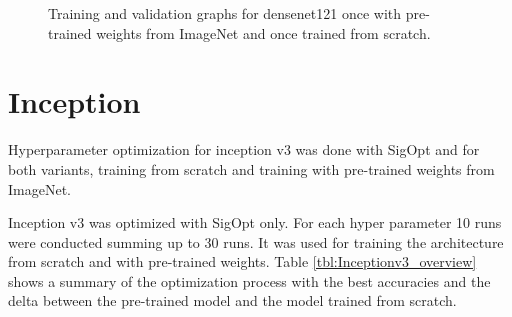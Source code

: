 \begin{figure}[h]
\centering
\caption{Training and validation graphs for densenet121 once with pre-trained weights from ImageNet and once trained from scratch.}
\label{fig:densenet121-graph}
\end{figure}












\section{Inception}


Hyperparameter optimization for inception v3 was done with SigOpt and for both variants, training from scratch and training with pre-trained weights from ImageNet.

Inception v3 was optimized with SigOpt only. For each hyper parameter 10 runs were conducted summing up to 30 runs. It was used for training the architecture from scratch and with pre-trained weights. Table \ref{tbl:Inceptionv3_overview} shows a summary of the optimization process with the best accuracies and the delta between the pre-trained model and the model trained from scratch.

